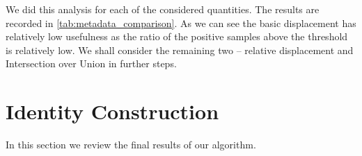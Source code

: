 We did this analysis for each of the considered quantities. The results are recorded in \autoref{tab:metadata_comparison}. As we can see the basic displacement has relatively low usefulness as the ratio of the positive samples above the threshold is relatively low. We shall consider the remaining two -- relative displacement and Intersection over Union in further steps.

\section{Identity Construction}

In this section we review the final results of our algorithm. 